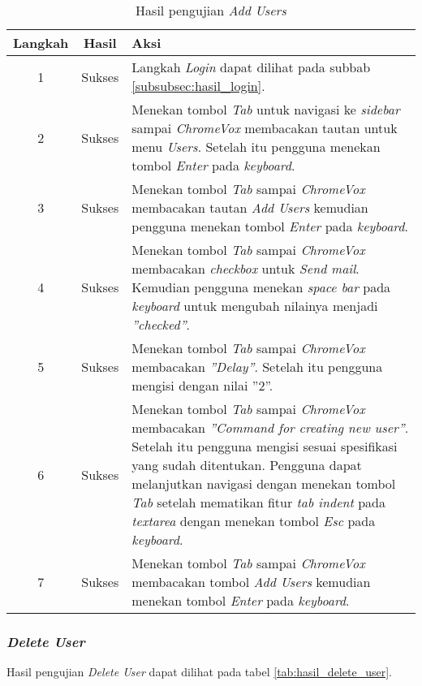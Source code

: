 \begin{table}[H]
	\centering
	\caption{Hasil pengujian \textit{Add Users}}
	\label{tab:hasil_add_users}
	\begin{tabular}{|c|c|p{12cm}|}
		\toprule
		Langkah & Hasil & Aksi\\
		\midrule
		1 & Sukses & Langkah \textit{Login} dapat dilihat pada subbab \ref{subsubsec:hasil_login}.\\
		2 & Sukses & Menekan tombol \textit{Tab} untuk navigasi ke \textit{sidebar} sampai \textit{ChromeVox} membacakan tautan untuk menu \textit{Users}. Setelah itu pengguna menekan tombol \textit{Enter} pada \textit{keyboard}.\\
		3 & Sukses & Menekan tombol \textit{Tab} sampai \textit{ChromeVox} membacakan tautan \textit{Add Users} kemudian pengguna menekan tombol \textit{Enter} pada \textit{keyboard}.\\
		4 & Sukses & Menekan tombol \textit{Tab} sampai \textit{ChromeVox} membacakan \textit{checkbox} untuk \textit{Send mail}. Kemudian pengguna menekan \textit{space bar} pada \textit{keyboard} untuk mengubah nilainya menjadi \textit{''checked''}.\\
		5 & Sukses & Menekan tombol \textit{Tab} sampai \textit{ChromeVox} membacakan \textit{''Delay''}. Setelah itu pengguna mengisi dengan nilai ''2''.\\
		6 & Sukses & Menekan tombol \textit{Tab} sampai \textit{ChromeVox} membacakan \textit{''Command for creating new user''}. Setelah itu pengguna mengisi sesuai spesifikasi yang sudah ditentukan. Pengguna dapat melanjutkan navigasi dengan menekan tombol \textit{Tab} setelah mematikan fitur \textit{tab indent} pada \textit{textarea} dengan menekan tombol \textit{Esc} pada \textit{keyboard}.\\
		7 & Sukses & Menekan tombol \textit{Tab} sampai \textit{ChromeVox} membacakan tombol \textit{Add Users} kemudian menekan tombol \textit{Enter} pada \textit{keyboard}.\\
		\bottomrule
	\end{tabular}
\end{table}

\subsubsection{\textit{Delete User}}
\label{subsubsec:hasil_delete_user}
Hasil pengujian \textit{Delete User} dapat dilihat pada tabel \ref{tab:hasil_delete_user}.

